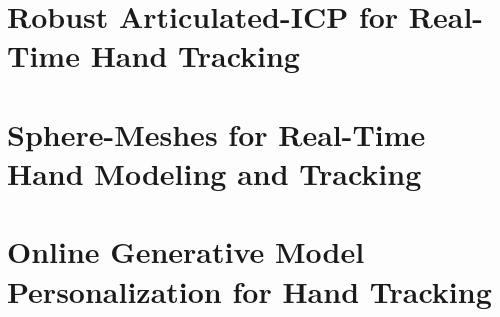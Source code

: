 

\usepackage{cite}
\usepackage{amsmath}
\usepackage{microtype}
\usepackage{overpic}
\usepackage{color}
\usepackage{amssymb}
\usepackage{graphicx}
\usepackage{changepage}
\usepackage{hyperref}
\usepackage{longtable}
\usepackage{lscape}

\hypersetup{
    colorlinks=true,
    filecolor=magenta,      
    urlcolor=cyan,
}

  









\frontmatter



%


\tableofcontents

\setlength{\parskip}{1em}

\mainmatter



\chapter{Robust Articulated-ICP for Real-Time Hand Tracking} \label{ch:tracking}










\chapter{Sphere-Meshes for Real-Time Hand Modeling and Tracking} \label{ch:sphere-meshes}




 






\chapter{Online Generative Model Personalization for Hand Tracking} \label{ch:online}
















